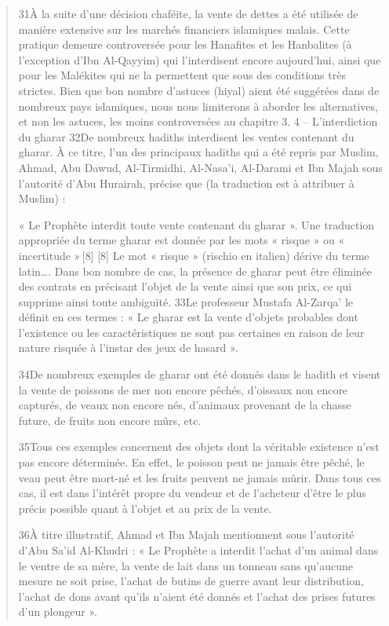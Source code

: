 \begin{quote}
31À la suite d’une décision chaféite, la vente de dettes a été utilisée de manière extensive sur les marchés financiers islamiques malais. Cette pratique demeure controversée pour les Hanafites et les Hanbalites (à l’exception d’Ibn Al-Qayyim) qui l’interdisent encore aujourd’hui, ainsi que pour les Malékites qui ne la permettent que sous des conditions très strictes. Bien que bon nombre d’astuces (hiyal) aient été suggérées dans de nombreux pays islamiques, nous nous limiterons à aborder les alternatives, et non les astuces, les moins controversées au chapitre 3.
4 – L’interdiction du gharar
32De nombreux hadiths interdisent les ventes contenant du gharar. À ce titre, l’un des principaux hadiths qui a été repris par Muslim, Ahmad, Abu Dawud, Al-Tirmidhi, Al-Nasa’i, Al-Darami et Ibn Majah sous l’autorité d’Abu Hurairah, précise que (la traduction est à attribuer à Muslim) :

« Le Prophète interdit toute vente contenant du gharar ».
Une traduction appropriée du terme gharar est donnée par les mots « risque » ou « incertitude » [8]
[8]
Le mot « risque » (rischio en italien) dérive du terme latin….
Dans bon nombre de cas, la présence de gharar peut être éliminée des contrats en précisant l’objet de la vente ainsi que son prix, ce qui supprime ainsi toute ambiguïté.
33Le professeur Mustafa Al-Zarqa’ le définit en ces termes : « Le gharar est la vente d’objets probables dont l’existence ou les caractéristiques ne sont pas certaines en raison de leur nature risquée à l’instar des jeux de hasard ».

34De nombreux exemples de gharar ont été donnés dans le hadith et visent la vente de poissons de mer non encore pêchés, d’oiseaux non encore capturés, de veaux non encore nés, d’animaux provenant de la chasse future, de fruits non encore mûrs, etc.

35Tous ces exemples concernent des objets dont la véritable existence n’est pas encore déterminée. En effet, le poisson peut ne jamais être pêché, le veau peut être mort-né et les fruits peuvent ne jamais mûrir. Dans tous ces cas, il est dans l’intérêt propre du vendeur et de l’acheteur d’être le plus précis possible quant à l’objet et au prix de la vente.

36À titre illustratif, Ahmad et Ibn Majah mentionnent sous l’autorité d’Abu Sa’id Al-Khudri : « Le Prophète a interdit l’achat d’un animal dans le ventre de sa mère, la vente de lait dans un tonneau sans qu’aucune mesure ne soit prise, l’achat de butins de guerre avant leur distribution, l’achat de dons avant qu’ils n’aient été donnés et l’achat des prises futures d’un plongeur ».


\end{quote}
